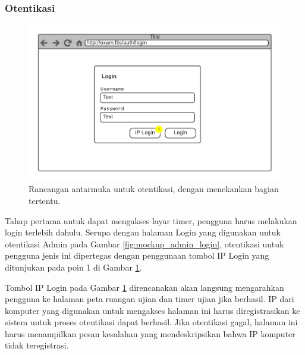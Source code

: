 \subsubsection{Otentikasi}
    \begin{figure}
        \centering
        \includegraphics[width=0.7\paperwidth]{Gambar/mockups/Mockup--DosenPengawas - Login.pdf}
        \caption{Rancangan antarmuka untuk otentikasi, dengan menekankan bagian tertentu.}
        \label{fig:mockup_dosen_login}
    \end{figure}
    Tahap pertama untuk dapat mengakses layar timer, pengguna harus melakukan login terlebih dahulu.
    Serupa dengan halaman Login yang digunakan untuk otentikasi Admin pada Gambar
    \ref{fig:mockup_admin_login}, otentikasi untuk pengguna jenis ini dipertegas dengan penggunaan
    tombol IP Login yang ditunjukan pada poin 1 di Gambar \ref{fig:mockup_dosen_login}.
    
    Tombol IP Login pada Gambar \ref{fig:mockup_dosen_login} direncanakan akan langsung mengarahkan 
    pengguna ke halaman peta ruangan ujian dan timer ujian jika berhasil. IP dari komputer yang
    digunakan untuk mengakses halaman ini harus diregistrasikan ke sistem untuk proses otentikasi
    dapat berhasil. Jika otentikasi gagal, halaman ini harus menampilkan pesan kesalahan yang
    mendeskripsikan bahwa IP komputer tidak teregistrasi.
    
